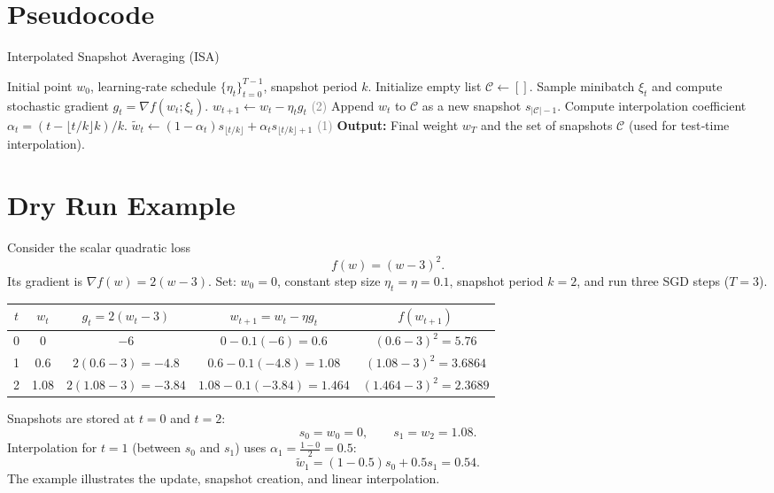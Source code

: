 \documentclass{article}
\begin{document}
\section*{Pseudocode}
\begin{algorithm}[H]
\caption{Interpolated Snapshot Averaging (ISA)}
\begin{algorithmic}[1]
\Require Initial point $w_0$, learning‑rate schedule $\{\eta_t\}_{t=0}^{T-1}$, snapshot period $k$.
\State Initialize empty list $\mathcal{C}\leftarrow []$.
    \State Sample minibatch $\xi_t$ and compute stochastic gradient $g_t=\nabla f(w_t;\xi_t)$.
    \State $w_{t+1}\gets w_t-\eta_t g_t$ \hfill \textcolor{gray}{\small (2)}
        \State Append $w_t$ to $\mathcal{C}$ as a new snapshot $s_{|\mathcal{C}|-1}$.
    \EndIf
    \State Compute interpolation coefficient $\alpha_t=(t-\lfloor t/k\rfloor k)/k$.
    \State $\tilde w_t \gets (1-\alpha_t)s_{\lfloor t/k\rfloor}+ \alpha_t s_{\lfloor t/k\rfloor+1}$ \hfill \textcolor{gray}{\small (1)}
\EndFor
\State \textbf{Output:} Final weight $w_T$ and the set of snapshots $\mathcal{C}$ (used for test‑time interpolation).
\end{algorithmic}
\end{algorithm}

\section*{Dry Run Example}
Consider the scalar quadratic loss
\[
f(w) = (w-3)^2 .
\]
Its gradient is $\nabla f(w)=2(w-3)$.  
Set: $w_0=0$, constant step size $\eta_t=\eta=0.1$, snapshot period $k=2$, and run three SGD steps ($T=3$).

\begin{center}
\begin{tabular}{c|c|c|c|c}
$t$ & $w_t$ & $g_t=2(w_t-3)$ & $w_{t+1}=w_t-\eta g_t$ & $f(w_{t+1})$\\ \hline
0 & 0 & $-6$ & $0-0.1(-6)=0.6$ & $(0.6-3)^2=5.76$\\
1 & 0.6 & $2(0.6-3)=-4.8$ & $0.6-0.1(-4.8)=1.08$ & $(1.08-3)^2=3.6864$\\
2 & 1.08 & $2(1.08-3)=-3.84$ & $1.08-0.1(-3.84)=1.464$ & $(1.464-3)^2=2.3689$\\
\end{tabular}
\end{center}

Snapshots are stored at $t=0$ and $t=2$:
\[
s_0 = w_0 =0,\qquad s_1 = w_2 =1.08 .
\]
Interpolation for $t=1$ (between $s_0$ and $s_1$) uses $\alpha_1 =\frac{1-0}{2}=0.5$:
\[
\tilde w_1 = (1-0.5)s_0 +0.5 s_1 =0.54 .
\]
The example illustrates the update, snapshot creation, and linear interpolation.
\end{document}
